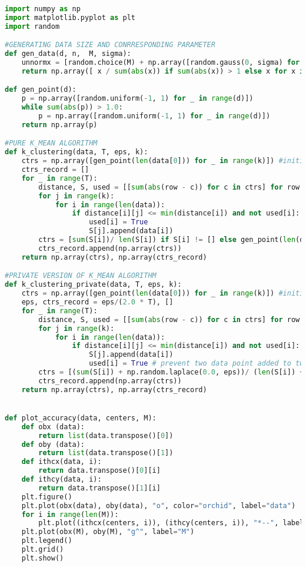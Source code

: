 %
\begin{lstlisting}[label = code-p4-3, language=Python, caption=Python Code for Problem 4 - 3]
import numpy as np
import matplotlib.pyplot as plt
import random

#GENERATING DATA SIZE AND CONRRESPONDING PARAMETER
def gen_data(d, n,  M, sigma):
	unnormx = [random.choice(M) + np.array([random.gauss(0, sigma) for _ in range(d)]) for i in range(n)]
	return np.array([ x / sum(abs(x)) if sum(abs(x)) > 1 else x for x in unnormx]) 

def gen_point(d):
	p = np.array([random.uniform(-1, 1) for _ in range(d)])
	while sum(abs(p)) > 1.0:
		p = np.array([random.uniform(-1, 1) for _ in range(d)])
	return np.array(p)

#PURE K_MEAN ALGORITHM
def k_clustering(data, T, eps, k):
	ctrs = np.array([gen_point(len(data[0])) for _ in range(k)]) #initialize the centers
	ctrs_record = []
	for _ in range(T):
		distance, S, used = [[sum(abs(row - c)) for c in ctrs] for row in data], [[] for _ in range(k)], [False]*len(data)
		for j in range(k):
			for i in range(len(data)):
				if distance[i][j] <= min(distance[i]) and not used[i]:
					used[i] = True
					S[j].append(data[i])
		ctrs = [sum(S[i])/ len(S[i]) if S[i] != [] else gen_point(len(data[0])) for i in range(k)]
		ctrs_record.append(np.array(ctrs))
	return np.array(ctrs), np.array(ctrs_record)

#PRIVATE VERSION OF K_MEAN ALGORITHM
def k_clustering_private(data, T, eps, k):
	ctrs = np.array([gen_point(len(data[0])) for _ in range(k)]) #initialize the centers
	eps, ctrs_record = eps/(2.0 * T), []
	for _ in range(T):
		distance, S, used = [[sum(abs(row - c)) for c in ctrs] for row in data], [[] for _ in range(k)], [False]*len(data)
		for j in range(k):
			for i in range(len(data)):
				if distance[i][j] <= min(distance[i]) and not used[i]:
					S[j].append(data[i])
					used[i] = True # prevent two data point added to two different sets when they have the same distance
		ctrs = [(sum(S[i]) + np.random.laplace(0.0, eps))/ (len(S[i]) + np.random.laplace(0.0, 2*eps)) if len(S[i]) > 5 else gen_point(len(data[0])) for i in range(k)]
		ctrs_record.append(np.array(ctrs))
	return np.array(ctrs), np.array(ctrs_record)


def plot_accuracy(data, centers, M):
	def obx (data):
		return list(data.transpose()[0])
	def oby (data):
		return list(data.transpose()[1])
	def ithcx(data, i):
		return data.transpose()[0][i]
	def ithcy(data, i):
		return data.transpose()[1][i]
	plt.figure()
	plt.plot(obx(data), oby(data), "o", color="orchid", label="data")
	for i in range(len(M)):
		plt.plot((ithcx(centers, i)), (ithcy(centers, i)), "*--", label="centers" + str(i))
	plt.plot(obx(M), oby(M), "g^", label="M")
	plt.legend()
	plt.grid()
	plt.show()





\end{lstlisting}

